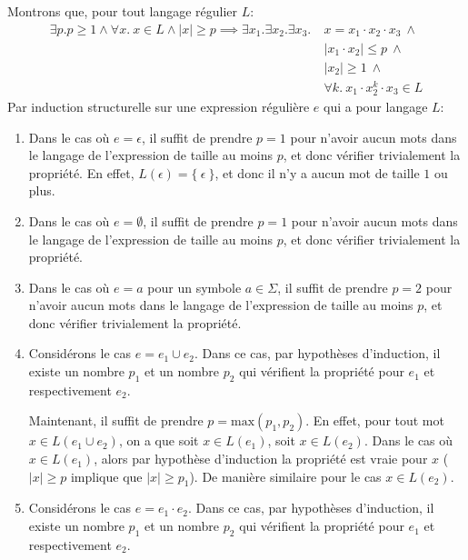 \documentclass[12pt,french,a4paper]{article}
\begin{document}
\begin{question}
Montrons que, pour tout langage régulier $L$:
\begin{align*}
\exists p. p \geq 1 \wedge \forall x.\ x \in L \wedge |x| \geq p \implies \exists x_1. \exists x_2. \exists x_3.\ &x = x_1 \cdot x_2 \cdot x_3\ \wedge\\
&|x_1 \cdot x_2| \leq p\ \wedge\\
&|x_2| \geq 1\ \wedge\\
&\forall k.\ x_1 \cdot x_2^k \cdot x_3 \in L
\end{align*}
Par induction structurelle sur une expression régulière $e$ qui a pour langage $L$:
\begin{enumerate}
\item
Dans le cas où $e = \epsilon$, il suffit de prendre $p = 1$ pour n'avoir aucun mots dans le langage de l'expression de taille au moins $p$, et donc vérifier trivialement la propriété. En effet, $L(\epsilon) = \{\ \epsilon\ \}$, et donc il n'y a aucun mot de taille $1$ ou plus.
\item
Dans le cas où $e = \emptyset$, il suffit de prendre $p = 1$ pour n'avoir aucun mots dans le langage de l'expression de taille au moins $p$, et donc vérifier trivialement la propriété.
\item
Dans le cas où $e = a$ pour un symbole $a \in \Sigma$, il suffit de prendre $p = 2$ pour n'avoir aucun mots dans le langage de l'expression de taille au moins $p$, et donc vérifier trivialement la propriété.
\item
Considérons le cas $e = e_1 \cup e_2$. Dans ce cas, par hypothèses d'induction, il existe un nombre $p_1$ et un nombre $p_2$ qui vérifient la propriété pour $e_1$ et respectivement $e_2$.

Maintenant, il suffit de prendre $p = \text{max}(p_1, p_2)$. En effet, pour tout mot $x \in L(e_1 \cup e_2)$, on a que soit $x \in L(e_1)$, soit $x \in L(e_2)$. Dans le cas où $x \in L(e_1)$, alors par hypothèse d'induction la propriété est vraie pour $x$ ($|x| \geq p$ implique que $|x| \geq p_1$). De manière similaire pour le cas $x \in L(e_2)$.

\item
Considérons le cas $e = e_1 \cdot e_2$. Dans ce cas, par hypothèses d'induction, il existe un nombre $p_1$ et un nombre $p_2$ qui vérifient la propriété pour $e_1$ et respectivement $e_2$.


\end{enumerate}
\end{question}
\end{document}
